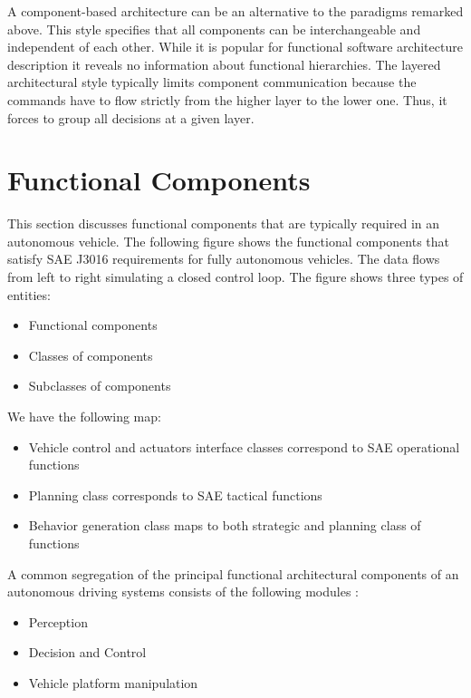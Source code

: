 A component-based architecture can be an alternative to the paradigms remarked above. This style specifies that all
components can be interchangeable and independent of each other. While it is popular for functional software architecture description
it reveals no information about functional hierarchies. The layered architectural style typically limits component communication
because the commands have to flow strictly from the higher layer to the lower one. Thus, it forces to group all decisions at a given layer.

\section{Functional Components}
\label{functional_components}
This section discusses functional components that are typically required in an autonomous vehicle. The following figure shows the functional components
that satisfy SAE J3016 requirements for fully autonomous vehicles. The data flows from left to right simulating a closed control loop. The figure
shows three types of entities:

\begin{itemize}
\item Functional components 
\item Classes of components 
\item Subclasses of components
\end{itemize}

We have the following map:

\begin{itemize}
\item Vehicle control and actuators interface classes correspond to SAE operational functions  
\item Planning class corresponds to SAE tactical functions 
\item Behavior generation class maps to both strategic and planning class of functions
\end{itemize}

A common segregation of the principal functional architectural components of an autonomous driving systems consists of the following modules \cite{Bahere}:

\begin{itemize}
\item Perception
\item Decision and Control
\item Vehicle platform manipulation
\end{itemize}


